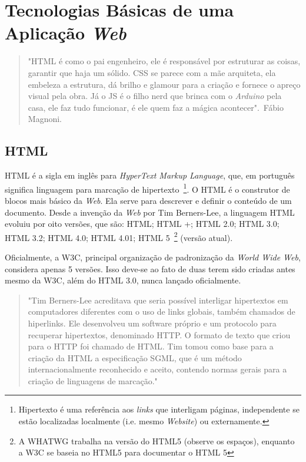 \section{Tecnologias Básicas de uma Aplicação \textit{Web}}
\label{BaseWeb}

\begin{quote}
\small{
"HTML é como o pai engenheiro, ele é responsável por estruturar as coisas, garantir que haja um sólido. CSS se parece com a mãe arquiteta, ela embeleza a estrutura, dá brilho e glamour para a criação e fornece o apreço visual pela obra. Já o JS é o filho nerd que brinca com o \textit{Arduino} pela casa, ele faz tudo funcionar, é ele quem faz a mágica acontecer".~Fábio Magnoni.
}
\end{quote}

\subsection{HTML}
\label{SubHTML}

HTML é a sigla em inglês para \textit{HyperText Markup Language}, que, em português significa linguagem para marcação de hipertexto~\footnote{Hipertexto é uma referência aos \textit{links} que interligam páginas, independente se estão localizadas localmente (i.e. mesmo \textit{Website}) ou externamente.}. O HTML é o construtor de blocos mais básico da \textit{Web}. Ela serve para descrever e definir o conteúdo de um documento. Desde a invenção da \textit{Web} por Tim Berners-Lee, a linguagem HTML evoluiu por oito versões, que são: HTML; HTML +; HTML 2.0; HTML 3.0; HTML 3.2; HTML 4.0; HTML 4.01; HTML 5~\footnote{A WHATWG trabalha na versão do HTML5 (observe os espaços), enquanto a W3C se baseia no HTML5 para documentar o HTML 5} (versão atual).

Oficialmente, a W3C, principal organização de padronização da \textit{World Wide Web}, considera apenas 5 versões. Isso deve-se ao fato de duas terem sido criadas antes mesmo da W3C, além do HTML 3.0, nunca lançado oficialmente.

\begin{quote}
\small{
"Tim Berners-Lee acreditava que seria possível interligar hipertextos em computadores diferentes com o uso de links globais, também chamados de hiperlinks. Ele desenvolveu um software próprio e um protocolo para recuperar hipertextos, denominado HTTP. O formato de texto que criou para o HTTP foi chamado de HTML. Tim tomou como base para a criação da HTML a especificação SGML, que é um método internacionalmente reconhecido e aceito, contendo normas gerais para a criação de linguagens de marcação."~
}
\end{quote}

